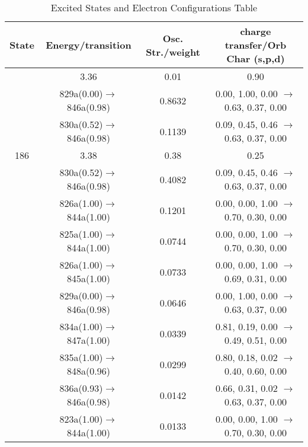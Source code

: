 \documentclass[10pt,a4paper]{article}
\begin{document}
 \centering
 \begin{longtable}{c|c|c|c}
   \caption{Excited States and Electron Configurations Table}
   \hline
     State & Energy/transition & Osc. Str./weight & charge transfer/Orb Char (s,p,d)\\
    \hline 
 
   \endfirsthead 
   \hline
   \endhead
   \hline
   \endfoot
   \endlastfoot 
181 &	 3.36 &	 0.01 &	 0.90 \\ 
  	& 829a(0.00)$\rightarrow$846a(0.98) &	 0.8632 &	 0.00, 1.00, 0.00 $\rightarrow$ 0.63, 0.37, 0.00 \\ 
 	& 830a(0.52)$\rightarrow$846a(0.98) &	 0.1139 &	 0.09, 0.45, 0.46 $\rightarrow$ 0.63, 0.37, 0.00 \\ 
 \hline186 &	 3.38 &	 0.38 &	 0.25 \\ 
  	& 830a(0.52)$\rightarrow$846a(0.98) &	 0.4082 &	 0.09, 0.45, 0.46 $\rightarrow$ 0.63, 0.37, 0.00 \\ 
 	& 826a(1.00)$\rightarrow$844a(1.00) &	 0.1201 &	 0.00, 0.00, 1.00 $\rightarrow$ 0.70, 0.30, 0.00 \\ 
 	& 825a(1.00)$\rightarrow$844a(1.00) &	 0.0744 &	 0.00, 0.00, 1.00 $\rightarrow$ 0.70, 0.30, 0.00 \\ 
 	& 826a(1.00)$\rightarrow$845a(1.00) &	 0.0733 &	 0.00, 0.00, 1.00 $\rightarrow$ 0.69, 0.31, 0.00 \\ 
 	& 829a(0.00)$\rightarrow$846a(0.98) &	 0.0646 &	 0.00, 1.00, 0.00 $\rightarrow$ 0.63, 0.37, 0.00 \\ 
 	& 834a(1.00)$\rightarrow$847a(1.00) &	 0.0339 &	 0.81, 0.19, 0.00 $\rightarrow$ 0.49, 0.51, 0.00 \\ 
 	& 835a(1.00)$\rightarrow$848a(0.96) &	 0.0299 &	 0.80, 0.18, 0.02 $\rightarrow$ 0.40, 0.60, 0.00 \\ 
 	& 836a(0.93)$\rightarrow$846a(0.98) &	 0.0142 &	 0.66, 0.31, 0.02 $\rightarrow$ 0.63, 0.37, 0.00 \\ 
 	& 823a(1.00)$\rightarrow$844a(1.00) &	 0.0133 &	 0.00, 0.00, 1.00 $\rightarrow$ 0.70, 0.30, 0.00 \\ 
 \hline %
 \end{longtable} 
 
\end{document}
